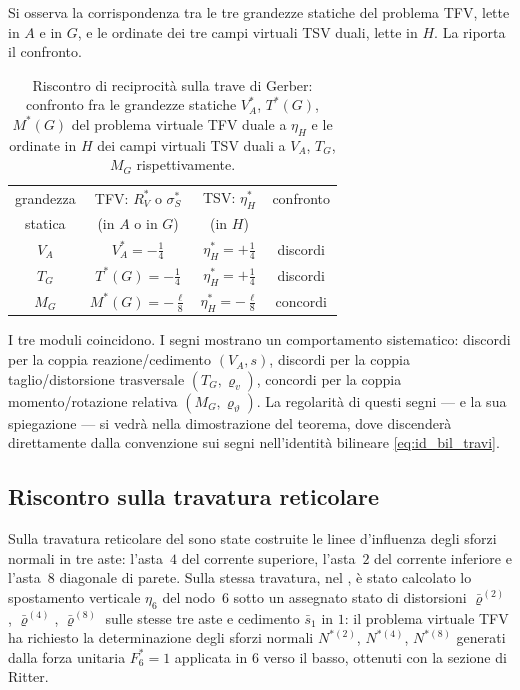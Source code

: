Si osserva la corrispondenza tra le tre grandezze statiche del 
problema TFV, lette in $A$ e in $G$, e le ordinate dei tre 
campi virtuali TSV duali, lette in $H$. La 
 riporta il confronto.

\begin{table}[ht]
	\centering
	\renewcommand{\arraystretch}{1.4}
	\begin{tabular}{c|c|c|c}
		\hline
		grandezza & TFV: $R^{*}_V$ o $\sigma^{*}_S$ & TSV: 
		$\eta^{*}_H$ & confronto \\
		statica & (in $A$ o in $G$) & (in $H$) & \\
		\hline
		$V_A$ & $V_A^{*}=-\tfrac{1}{4}$ & 
		$\eta^{*}_H=+\tfrac{1}{4}$ & discordi \\
		$T_G$ & $T^{*}(G)=-\tfrac{1}{4}$ & 
		$\eta^{*}_H=+\tfrac{1}{4}$ & discordi \\
		$M_G$ & $M^{*}(G)=-\tfrac{\ell}{8}$ & 
		$\eta^{*}_H=-\tfrac{\ell}{8}$ & concordi \\
		\hline
	\end{tabular}
	\caption{Riscontro di reciprocità sulla trave di Gerber: 
		confronto fra le grandezze statiche $V_A^{*}$, $T^{*}(G)$, 
		$M^{*}(G)$ del problema virtuale TFV duale a $\eta_H$ e le 
		ordinate in $H$ dei campi virtuali TSV duali a $V_A$, $T_G$, 
		$M_G$ rispettivamente.}
	\label{tab:reciprocita_gerber}
\end{table}

I tre moduli coincidono. I segni mostrano un comportamento 
sistematico: discordi per la coppia reazione/cedimento $(V_A, s)$, 
discordi per la coppia taglio/distorsione trasversale $(T_G, 
\varrho_v)$, concordi per la coppia momento/rotazione relativa 
$(M_G, \varrho_\vartheta)$. La regolarità di questi segni --- e 
la sua spiegazione --- si vedrà nella dimostrazione del teorema, 
dove discenderà direttamente dalla convenzione sui segni nell'identità 
bilineare \eqref{eq:id_bil_travi}.


\subsection*{Riscontro sulla travatura reticolare}

Sulla travatura reticolare del  sono 
state costruite le linee d'influenza degli sforzi normali in tre 
aste: l'asta~$4$ del corrente superiore, l'asta~$2$ del corrente 
inferiore e l'asta~$8$ diagonale di parete. Sulla stessa 
travatura, nel , è stato calcolato 
lo spostamento verticale $\eta_6$ del nodo~$6$ sotto un assegnato 
stato di distorsioni $\bar\varrho^{(2)}$, $\bar\varrho^{(4)}$, 
$\bar\varrho^{(8)}$ sulle stesse tre aste e cedimento $\bar s_1$ 
in $1$: il problema virtuale TFV ha richiesto la determinazione 
degli sforzi normali $N^{*(2)}$, $N^{*(4)}$, $N^{*(8)}$ generati 
dalla forza unitaria $F^{*}_6=1$ applicata in $6$ verso il basso, 
ottenuti con la sezione di Ritter.

